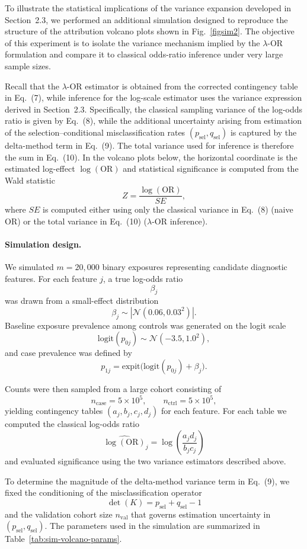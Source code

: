 \documentclass[pdflatex,sn-mathphys-num]{sn-jnl}%
\theoremstyle{thmstyleone}%
\theoremstyle{thmstyletwo}%
\theoremstyle{thmstylethree}%
\begin{document}
To illustrate the statistical implications of the variance expansion developed in
Section~2.3, we performed an additional simulation designed to reproduce the
structure of the attribution volcano plots shown in Fig.~\ref{figsim2}.  The
objective of this experiment is to isolate the variance mechanism implied by the
$\lambda$-OR formulation and compare it to classical odds-ratio inference under
very large sample sizes.

Recall that the $\lambda$-OR estimator is obtained from the corrected contingency
table in Eq.~(7), while inference for the log-scale estimator uses the variance
expression derived in Section~2.3.  Specifically, the classical sampling variance
of the log-odds ratio is given by Eq.~(8), while the additional uncertainty arising
from estimation of the selection--conditional misclassification rates
$(p_{\mathrm{sel}},q_{\mathrm{sel}})$ is captured by the delta-method term in
Eq.~(9).  The total variance used for inference is therefore the sum in Eq.~(10).
In the volcano plots below, the horizontal coordinate is the estimated
log-effect $\log(\mathrm{OR})$ and statistical significance is computed from the
Wald statistic
\[
Z=\frac{\log(\mathrm{OR})}{SE},
\]
where $SE$ is computed either using only the classical variance in Eq.~(8)
(naive OR) or the total variance in Eq.~(10) ($\lambda$-OR inference).

\paragraph{Simulation design.}
We simulated $m=20{,}000$ binary exposures representing candidate diagnostic
features.  For each feature $j$, a true log-odds ratio
\[
\beta_j
\]
was drawn from a small-effect distribution
\[
\beta_j \sim |\mathcal{N}(0.06,0.03^2)|.
\]
Baseline exposure prevalence among controls was generated on the logit scale
\[
\mathrm{logit}(p_{0j}) \sim \mathcal{N}(-3.5,1.0^2),
\]
and case prevalence was defined by
\[
p_{1j}=\mathrm{expit}\bigl(\mathrm{logit}(p_{0j})+\beta_j\bigr).
\]

Counts were then sampled from a large cohort consisting of
\[
n_{\mathrm{case}} = 5\times 10^{5},
\qquad
n_{\mathrm{ctrl}} = 5\times 10^{5},
\]
yielding contingency tables $(a_j,b_j,c_j,d_j)$ for each feature.
For each table we computed the classical log-odds ratio
\[
\widehat{\log(\mathrm{OR})}_j=\log\!\left(\frac{a_j d_j}{b_j c_j}\right)
\]
and evaluated significance using the two variance estimators described above.

To determine the magnitude of the delta-method variance term in
Eq.~(9), we fixed the conditioning of the misclassification operator
\[
\det(K)=p_{\mathrm{sel}}+q_{\mathrm{sel}}-1
\]
and the validation cohort size $n_{\mathrm{val}}$ that governs estimation
uncertainty in $(p_{\mathrm{sel}},q_{\mathrm{sel}})$.  The parameters used in the
simulation are summarized in Table~\ref{tab:sim-volcano-params}.
\end{document}
